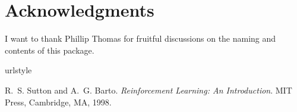 \documentclass[a4paper]{article}
\begin{document}
\section{Acknowledgments}
\label{sec:thanks}
I want to thank Phillip Thomas for fruitful discussions on the naming and contents of this package.



\begin{thebibliography}{1}
\providecommand{\natexlab}[1]{#1}
\providecommand{\url}[1]{\texttt{#1}}
\expandafter\ifx\csname urlstyle\endcsname\relax
  \providecommand{\doi}[1]{doi: #1}\else
  \providecommand{\doi}{doi: \begingroup \urlstyle{rm}\Url}\fi

R.~S. Sutton and A.~G. Barto.
\newblock \emph{Reinforcement Learning: {A}n Introduction}.
\newblock MIT Press, Cambridge, MA, 1998.

\end{thebibliography}

\end{document}
